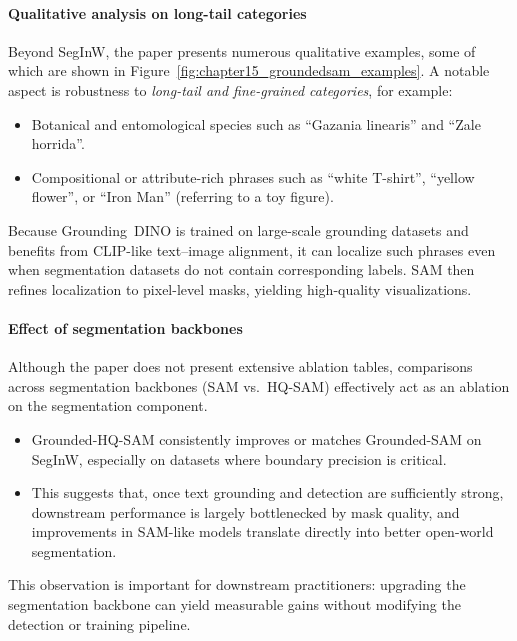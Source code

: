 \begin{enrichment}
\begin{enrichment}
		\paragraph{Qualitative analysis on long-tail categories}
		Beyond SegInW, the paper presents numerous qualitative examples, some of which are shown in Figure~\ref{fig:chapter15_groundedsam_examples}.
		A notable aspect is robustness to \emph{long-tail and fine-grained categories}, for example:
		
		\begin{itemize}
			\item Botanical and entomological species such as ``Gazania linearis'' and ``Zale horrida''.
			\item Compositional or attribute-rich phrases such as ``white T-shirt'', ``yellow flower'', or ``Iron Man'' (referring to a toy figure).
		\end{itemize}
		
		Because Grounding~DINO is trained on large-scale grounding datasets and benefits from CLIP-like text--image alignment, it can localize such phrases even when segmentation datasets do not contain corresponding labels.
		SAM then refines localization to pixel-level masks, yielding high-quality visualizations.
		
		\paragraph{Effect of segmentation backbones}
		Although the paper does not present extensive ablation tables, comparisons across segmentation backbones (SAM vs.\ HQ-SAM) effectively act as an ablation on the segmentation component.
		
		\begin{itemize}
			\item Grounded-HQ-SAM consistently improves or matches Grounded-SAM on SegInW, especially on datasets where boundary precision is critical.
			\item This suggests that, once text grounding and detection are sufficiently strong, downstream performance is largely bottlenecked by mask quality, and improvements in SAM-like models translate directly into better open-world segmentation.
		\end{itemize}
		
		This observation is important for downstream practitioners: upgrading the segmentation backbone can yield measurable gains without modifying the detection or training pipeline.
		

\end{enrichment}
\end{enrichment}
